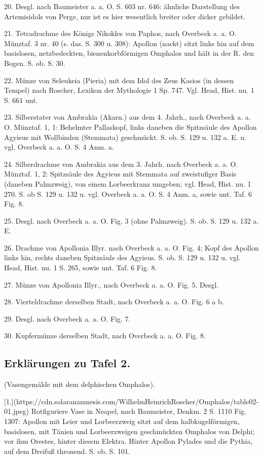 \documentclass[a4paper, 11pt, oneside]{article}
\begin{document}
20. Desgl. nach Baumeister a. a. O. S. 603 nr. 646: ähnliche Darstellung des Artemisidols von Perge, nur ist es hier wesentlich breiter oder dicker gebildet.

21. Tetradrachme des Königs Nikokles von Paphos, nach Overbeck a. a. O. Münztaf. 3 nr. 40 (s. das. S. 300 u. 308): Apollon (nackt) sitzt links hin auf dem basislosen, netzbedeckten, bienenkorbförmigen Omphalos und hält in der R. den Bogen. S. ob. S. 30.

22. Münze von Seleukeia (Pieria) mit dem Idol des Zeus Kasios (in dessen Tempel) nach Roscher, Lexikon der Mythologie 1 Sp. 747. Vgl. Head, Hist. nu. 1 S. 661 unt.

23. Silberstater von Ambrakia (Akarn.) aus dem 4. Jahrh., nach Overbeck a. a. O. Münztaf. 1, 1: Behelmter Pallaskopf, links daneben die Spitzsäule des Apollon Agyieus mit Wollbinden (Stemmata) geschmückt. S. ob. S. 129 u. 132 a. E. u. vgl. Overbeck a. a. O. S. 4 Anm. a.

24. Silberdrachme von Ambrakia aus dem 3. Jahrh. nach Overbeck a. a. O. Münztaf. 1, 2: Spitzsäule des Agyieus mit Stemmata auf zweistufiger Basis (daneben Palmzweig), von einem Lorbeerkranz umgeben; vgl. Head, Hist. nu. 1 270. S. ob S. 129 u. 132 u. vgl. Overbeck a. a. O. S. 4 Anm. a, sowie unt. Taf. 6 Fig. 8.

25. Desgl. nach Overbeck a. a. O. Fig. 3 (ohne Palmzweig). S. ob. S. 129 u. 132 a. E.

26. Drachme von Apollonia Illyr. nach Overbeck a. a. O. Fig. 4; Kopf des Apollon links hin, rechts daneben Spitzsäule des Agyieus. S. ob. S. 129 u. 132 u. vgl. Head, Hist. nu. 1 S. 265, sowie unt. Taf. 6 Fig. 8.

27. Münze von Apollonia Illyr., nach Overbeck a. a. O. Fig. 5. Desgl.

28. Vierteldrachme derselben Stadt, nach Overbeck a. a. O. Fig. 6 a b.

29. Desgl. nach Overbeck a. a. O. Fig. 7.

30. Kupfermünze derselben Stadt, nach Overbeck a. a. O. Fig. 8.
\clearpage
\subsection{Erklärungen zu Tafel 2.}

(Vasengemälde mit dem delphischen Omphalos).

[1.](https://cdn.solaranamnesis.com/WilhelmHeinrichRoscher/Omphalos/table02-01.jpeg) Rotfiguriere Vase in Neapel, nach Baumeister, Denkm. 2 S. 1110 Fig. 1307: Apollon mit Leier und Lorbeerzweig sitzt auf dem halbkugelförmigen, basislosen, mit Tänien und Lorbeerzweigen geschmückten Omphalos von Delphi; vor ihm Orestes, hinter diesem Elektra. Hinter Apollon Pylades und die Pythia, auf dem Dreifuß thronend. S. ob. S. 101.
\end{document}
